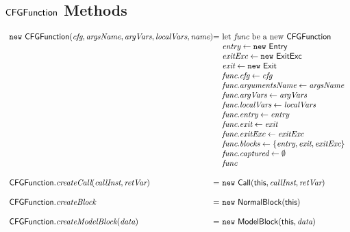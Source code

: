 \subsection{$\mbox{\textsf{CFGFunction}}$ Methods}
\[
\begin{array}{l@{}l@{~}l}
\new\ \CFGFunction(\emph{cfg}, \emph{argsName}, \emph{argVars}, \emph{localVars}, \emph{name})
& = & \text{let } \emph{func} \text{ be a new } \CFGFunction\\
& & \emph{entry} \leftarrow \new\ \Entry\\
& & \emph{exitExc} \leftarrow \new\ \ExitExc\\
& & \emph{exit} \leftarrow \new\ \Exit\\
& & \emph{func}.\emph{cfg} \leftarrow \emph{cfg} \\
& & \emph{func}.\emph{argumentsName} \leftarrow \emph{argsName} \\
& & \emph{func}.\emph{argVars} \leftarrow \emph{argVars}\\
& & \emph{func}.\emph{localVars} \leftarrow \emph{localVars}\\
& & \emph{func}.\emph{entry} \leftarrow \emph{entry}\\
& & \emph{func}.\emph{exit} \leftarrow \emph{exit}\\
& & \emph{func}.\emph{exitExc} \leftarrow \emph{exitExc}\\
& & \emph{func}.\emph{blocks} \leftarrow \{ \emph{entry}, \emph{exit}, \emph{exitExc} \}\\
& & \emph{func}.\emph{captured} \leftarrow \emptyset\\
& & \emph{func}\\
& & \\

\CFGFunction.\emph{createCall}(\emph{callInst}, \emph{retVar})
& = & \new\ \Call(\this, \emph{callInst}, \emph{retVar})\\
& & \\

\CFGFunction.\emph{createBlock}
& = & \new\ \NormalBlock(\this)\\
& & \\

\CFGFunction.\emph{createModelBlock}(\emph{data})
& = & \new\ \ModelBlock(\this, \emph{data})\\
\end{array}
\]

